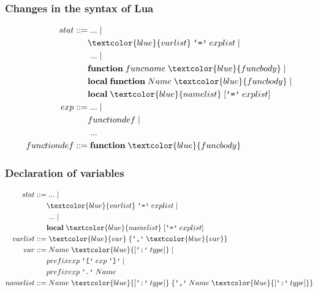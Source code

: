 \documentclass{beamer}
\begin{document}
\begin{frame}
\frametitle{Changes in the syntax of Lua}
\begin{align*}
stat ::= & \; ... \; |\\
& \textcolor{blue}{varlist} \; \texttt{`='} \; explist \; |\\
& \; ... \; |\\
& \textbf{function} \; funcname \; \textcolor{blue}{funcbody} \; |\\
& \textbf{local} \; \textbf{function} \; Name \; \textcolor{blue}{funcbody} \; |\\
& \textbf{local} \; \textcolor{blue}{namelist} \; [\texttt{`='} \; explist]\\
exp ::= & \; ... \; |\\
& functiondef \; |\\
& \; ...\\
functiondef ::= & \; \textbf{function} \; \textcolor{blue}{funcbody}
\end{align*}
\end{frame}

\begin{frame}
\frametitle{Declaration of variables}
\begin{align*}
stat ::= & \; ... \; |\\
& \textcolor{blue}{varlist} \; \texttt{`='} \; explist \; |\\
& \; ... \; |\\
& \textbf{local} \; \textcolor{blue}{namelist} \; [\texttt{`='} \; explist]\\
varlist ::= & \; \textcolor{blue}{var} \; \{\texttt{`,'} \; \textcolor{blue}{var}\}\\
var ::= & \; Name \; \textcolor{blue}{[\texttt{`:'} \; type]} \; |\\
& prefixexp \; \texttt{`['} \; exp \; \texttt{`]'} \; |\\
& prefixexp \; \texttt{`.'} \; Name\\
namelist ::= & \; Name \; \textcolor{blue}{[\texttt{`:'} \; type]} \;
\{\texttt{`,'} \; Name \; \textcolor{blue}{[\texttt{`:'} \; type]}\}
\end{align*}
\end{frame}
\end{document}
